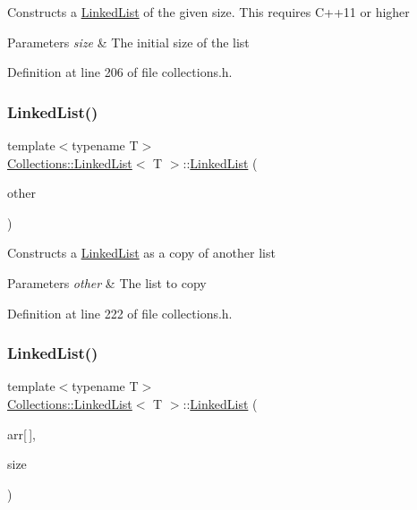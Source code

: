 Constructs a \hyperlink{class_collections_1_1_linked_list}{Linked\+List} of the given size. This requires C++11 or higher 
\begin{DoxyParams}{Parameters}
{\em size} & The initial size of the list \\
\hline
\end{DoxyParams}


Definition at line 206 of file collections.\+h.

\hypertarget{class_collections_1_1_linked_list_a98748f998c9a28fbf0767355b44a8d5d}{}\label{class_collections_1_1_linked_list_a98748f998c9a28fbf0767355b44a8d5d} 
\subsubsection{\texorpdfstring{Linked\+List()}{LinkedList()}\hspace{0.1cm}{\footnotesize\ttfamily [3/6]}}
{\footnotesize\ttfamily template$<$typename T$>$ \\
\hyperlink{class_collections_1_1_linked_list}{Collections\+::\+Linked\+List}$<$ T $>$\+::\hyperlink{class_collections_1_1_linked_list}{Linked\+List} (\begin{DoxyParamCaption}\item[{const \hyperlink{class_collections_1_1_linked_list}{Linked\+List}$<$ T $>$ \&}]{other }\end{DoxyParamCaption})}

Constructs a \hyperlink{class_collections_1_1_linked_list}{Linked\+List} as a copy of another list 
\begin{DoxyParams}{Parameters}
{\em other} & The list to copy \\
\hline
\end{DoxyParams}


Definition at line 222 of file collections.\+h.

\hypertarget{class_collections_1_1_linked_list_af6748fde41f293f6c3e9b945ca811a99}{}\label{class_collections_1_1_linked_list_af6748fde41f293f6c3e9b945ca811a99} 
\subsubsection{\texorpdfstring{Linked\+List()}{LinkedList()}\hspace{0.1cm}{\footnotesize\ttfamily [4/6]}}
{\footnotesize\ttfamily template$<$typename T$>$ \\
\hyperlink{class_collections_1_1_linked_list}{Collections\+::\+Linked\+List}$<$ T $>$\+::\hyperlink{class_collections_1_1_linked_list}{Linked\+List} (\begin{DoxyParamCaption}\item[{const T}]{arr\mbox{[}$\,$\mbox{]},  }\item[{unsigned int}]{size }\end{DoxyParamCaption})}

